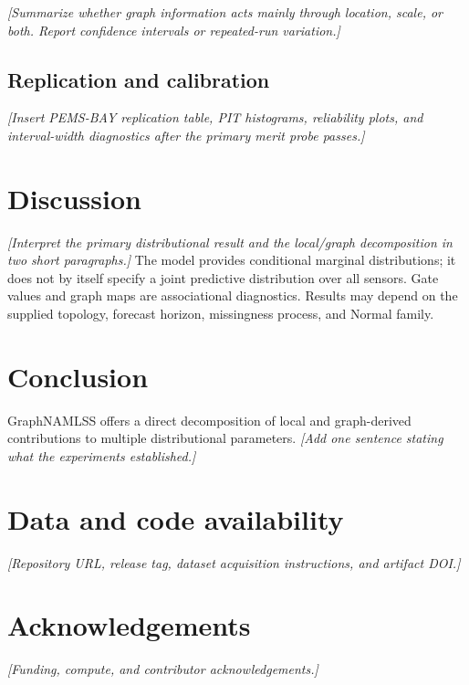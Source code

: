 \documentclass[11pt]{article}
\newcommand{\method}{GraphNAMLSS}
\newcommand{\datasetB}{PEMS-BAY}
\newcommand{\placeholder}[1]{\textcolor{placeholdergray}{\textit{[#1]}}}
\begin{document}
\placeholder{Summarize whether graph information acts mainly through location,
scale, or both. Report confidence intervals or repeated-run variation.}

\subsection{Replication and calibration}

\placeholder{Insert \datasetB{} replication table, PIT histograms, reliability
plots, and interval-width diagnostics after the primary merit probe passes.}

\section{Discussion}
\label{sec:discussion}

\placeholder{Interpret the primary distributional result and the local/graph
decomposition in two short paragraphs.}
The model provides conditional marginal distributions; it does not by itself
specify a joint predictive distribution over all sensors. Gate values and graph
maps are associational diagnostics. Results may depend on the supplied topology,
forecast horizon, missingness process, and Normal family.

\section{Conclusion}
\label{sec:conclusion}

\method{} offers a direct decomposition of local and graph-derived contributions
to multiple distributional parameters.
\placeholder{Add one sentence stating what the experiments established.}

\section*{Data and code availability}

\placeholder{Repository URL, release tag, dataset acquisition instructions, and
artifact DOI.}

\section*{Acknowledgements}

\placeholder{Funding, compute, and contributor acknowledgements.}



\end{document}
